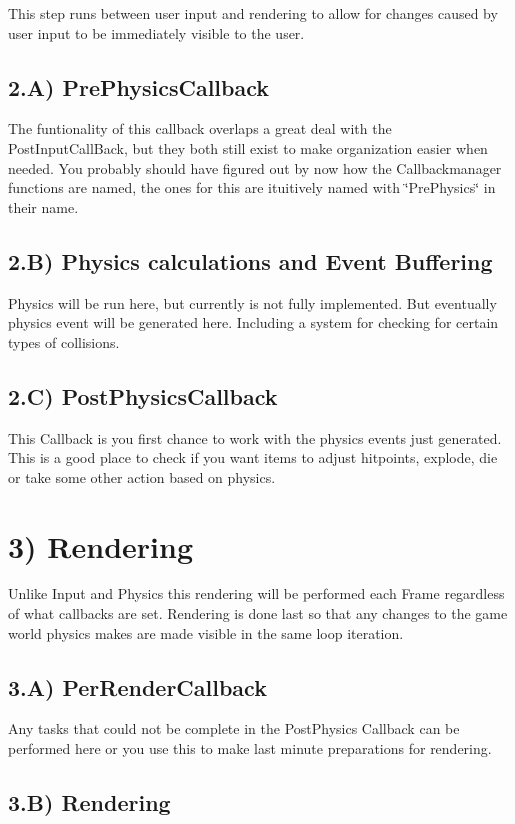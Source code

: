 This step runs between user input and rendering to allow for changes caused by user input to be immediately visible to the user. \hypertarget{mainloop1_physics1}{}\subsection{2.A) PrePhysicsCallback}\label{mainloop1_physics1}
The funtionality of this callback overlaps a great deal with the PostInputCallBack, but they both still exist to make organization easier when needed. You probably should have figured out by now how the Callbackmanager functions are named, the ones for this are ituitively named with \char`\"{}PrePhysics\char`\"{} in their name. \hypertarget{mainloop1_physics2}{}\subsection{2.B) Physics calculations and Event Buffering}\label{mainloop1_physics2}
Physics will be run here, but currently is not fully implemented. But eventually physics event will be generated here. Including a system for checking for certain types of collisions. \hypertarget{mainloop1_physics3}{}\subsection{2.C) PostPhysicsCallback}\label{mainloop1_physics3}
This Callback is you first chance to work with the physics events just generated. This is a good place to check if you want items to adjust hitpoints, explode, die or take some other action based on physics. \par
 \hypertarget{mainloop1_callbacks3}{}\section{3) Rendering}\label{mainloop1_callbacks3}
Unlike Input and Physics this rendering will be performed each Frame regardless of what callbacks are set. Rendering is done last so that any changes to the game world physics makes are made visible in the same loop iteration. \hypertarget{mainloop1_rendering1}{}\subsection{3.A) PerRenderCallback}\label{mainloop1_rendering1}
Any tasks that could not be complete in the PostPhysics Callback can be performed here or you use this to make last minute preparations for rendering. \hypertarget{mainloop1_rendering2}{}\subsection{3.B) Rendering}\label{mainloop1_rendering2}

